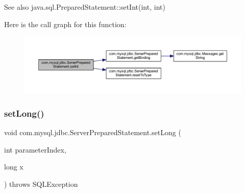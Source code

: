 \begin{DoxySeeAlso}{See also}
java.\+sql.\+Prepared\+Statement\+::set\+Int(int, int) 
\end{DoxySeeAlso}
Here is the call graph for this function\+:
\nopagebreak
\begin{figure}[H]
\begin{center}
\leavevmode
\includegraphics[width=350pt]{classcom_1_1mysql_1_1jdbc_1_1_server_prepared_statement_ae069199763eb91fc92b7db6c7ff583db_cgraph}
\end{center}
\end{figure}
\mbox{\label{classcom_1_1mysql_1_1jdbc_1_1_server_prepared_statement_a5bedcb6eb68aadc6691bba3b63b5904a}} 
\subsubsection{\texorpdfstring{set\+Long()}{setLong()}}
{\footnotesize\ttfamily void com.\+mysql.\+jdbc.\+Server\+Prepared\+Statement.\+set\+Long (\begin{DoxyParamCaption}\item[{int}]{parameter\+Index,  }\item[{long}]{x }\end{DoxyParamCaption}) throws S\+Q\+L\+Exception}

